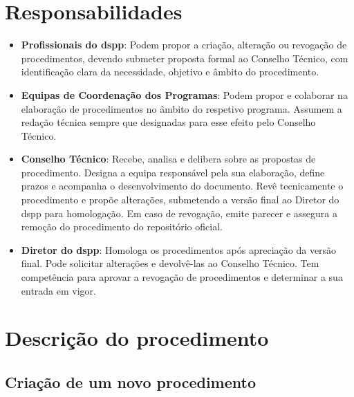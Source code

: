 \section{Responsabilidades}\label{sec:responsabilidades}

\begin{itemize}
    \item \textbf{Profissionais do \gls{dspp}}: Podem propor a criação, alteração ou revogação de procedimentos, devendo submeter proposta formal ao Conselho Técnico, com identificação clara da necessidade, objetivo e âmbito do procedimento.
    \item \textbf{Equipas de Coordenação dos Programas}: Podem propor e colaborar na elaboração de procedimentos no âmbito do respetivo programa. Assumem a redação técnica sempre que designadas para esse efeito pelo Conselho Técnico.
    \item \textbf{Conselho Técnico}: Recebe, analisa e delibera sobre as propostas de procedimento. Designa a equipa responsável pela sua elaboração, define prazos e acompanha o desenvolvimento do documento. Revê tecnicamente o procedimento e propõe alterações, submetendo a versão final ao Diretor do \gls{dspp} para homologação. Em caso de revogação, emite parecer e assegura a remoção do procedimento do repositório oficial.
    \item \textbf{Diretor do \gls{dspp}}: Homologa os procedimentos após apreciação da versão final. Pode solicitar alterações e devolvê-las ao Conselho Técnico. Tem competência para aprovar a revogação de procedimentos e determinar a sua entrada em vigor.
\end{itemize}


\section{Descrição do procedimento}\label{sec:descricao-do-procedimento}

\subsection{Criação de um novo procedimento}\label{sec:criacao-do-procedimento}

